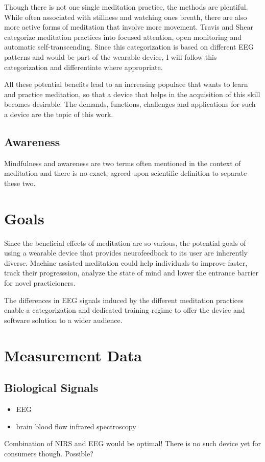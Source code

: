 \documentclass{llncs} %
\begin{document}
Though there is not one single meditation practice, the methods are plentiful. While often associated with stillness and watching ones breath,
there are also more active forms of meditation that involve more movement. Travis and Shear categorize meditation practices into focused attention, open monitoring and automatic self-transcending.\cite{Travis} 
Since this categorization is based on different EEG patterns and would be part of the wearable device, I will follow this categorization and differentiate where appropriate.

All these potential benefits lead to an increasing populace that wants to learn and practice meditation, so that a device that helps in the acquisition of this skill becomes desirable. 
The demands, functions, challenges and applications for such a device are the topic of this work.
\subsection{Awareness}
Mindfulness and awareness are two terms often mentioned in the context of meditation and there is no exact, agreed upon scientific definition to separate these two.
\section{Goals}
Since the beneficial effects of meditation are so various, the potential goals of using a wearable device 
that provides neurofeedback to its user are inherently diverse. Machine assisted meditation could help individuals to 
improve faster, track their progresssion, analyze the state of mind and lower the entrance barrier for novel practicioners. \cite{brand:del} \

The differences in EEG signals induced by the different meditation practices enable a categorization
and dedicated training regime to offer the device and software solution to a wider audience. \cite{Travis}
\section{Measurement Data}
\subsection{Biological Signals}
\begin{itemize}
    \item EEG
    \item brain blood flow infrared spectroscopy
\end{itemize}
Combination of NIRS and EEG would be optimal! There is no such device yet for consumers though.
Possible?
\end{document}
